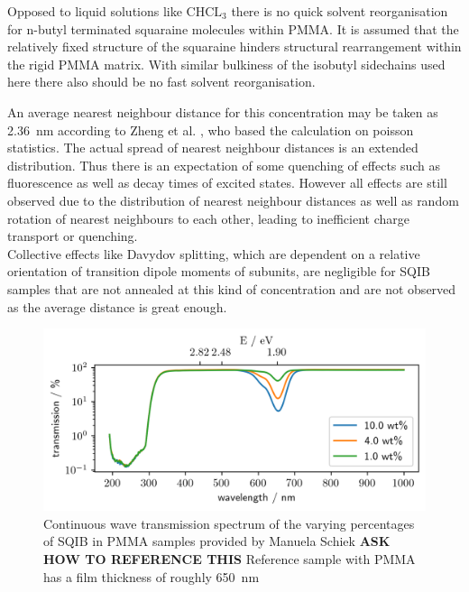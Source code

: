 \documentclass[twoside,openright]{scrreprt}
\begin{document}
{Opposed to liquid solutions like $\mathrm{CHCL_3}$ there is no quick solvent reorganisation for n-butyl terminated squaraine molecules within PMMA. It is assumed that the relatively fixed structure of the squaraine hinders structural rearrangement within the rigid PMMA matrix. With similar bulkiness of the isobutyl sidechains used here there also should be no fast solvent reorganisation. \cite{Zheng2020}

An average nearest neighbour distance for this concentration may be taken as \SI{2.36}{\nano\meter} according to Zheng et al. \cite{Zheng2020}, who based the calculation on poisson statistics\cite{Krider2003}. The actual spread of nearest neighbour distances is an extended distribution. Thus there is an expectation of some quenching of effects such as fluorescence as well as decay times of excited states. However all effects are still observed due to the distribution of nearest neighbour distances as well as random rotation of nearest neighbours to each other, leading to inefficient charge transport or quenching.\cite{Zheng2020} \\
Collective effects like Davydov splitting, which are dependent on a relative orientation of transition dipole moments of subunits, are negligible for SQIB samples that are not annealed at this kind of concentration and are not observed as the average distance is great enough.\\

\begin{figure}[!htp]
\centering
\includegraphics[scale = 1]{images/SQIB_VarPercentInPMMA_transmission.png}
\caption{Continuous wave transmission spectrum of the varying percentages of SQIB in PMMA samples provided by Manuela Schiek\label{fig:VarpercentCWspectrum} \textbf{ASK HOW TO REFERENCE THIS} Reference sample with PMMA has a film thickness of roughly \SI{650}{\nano\meter}}
\end{figure}

}
\end{document}
